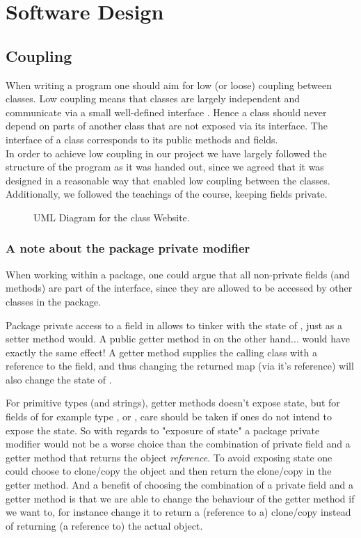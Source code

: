 \section{Software Design}

\subsection{Coupling}
When writing a program one should aim for low (or loose) coupling between classes. Low coupling means that classes are largely independent and communicate via a small well-defined interface \cite[p.259]{BK}. Hence a class should never depend on parts of another class that are not exposed via its interface. The interface of a class corresponds to its public methods and fields.
\\
In order to achieve low coupling in our project we have largely followed the structure of the program as it was handed out, since we agreed that it was designed in a reasonable way that enabled low coupling between the classes. Additionally, we followed the teachings of the course, keeping fields private.

 \begin{figure}[t]
	\centering
	\caption{UML Diagram for the class Website.}
	\label{fig:uml:single-class-website}
\end{figure}

 
\subsubsection{A note about the package private modifier}
When working within a package, one could argue that all non-private fields (and methods) are part of the interface, since they are allowed to be accessed by other classes in the package. 
 
Package private access to a field in  allows  to tinker with the state of , just as a setter method would.
A public getter method in  on the other hand... would have exactly the same effect!
A getter method supplies the calling class  with a reference to the field, and thus changing the returned map (via it's reference) will also change the state of .
 
For primitive types (and strings), getter methods doesn't expose state, but for fields of for example type ,  or , care should be taken if ones do not intend to expose the state.
So with regards to "exposure of state" a package private modifier would not be a worse choice than the combination of private field and a getter method that returns the object \emph{reference}. To avoid exposing state one could choose to clone/copy the object and then return the clone/copy in the getter method.
And a benefit of choosing the combination of a private field and a getter method is that we are able to change the behaviour of the getter method if we want to, for instance change it to return a (reference to a) clone/copy instead of returning (a reference to) the actual object. 



